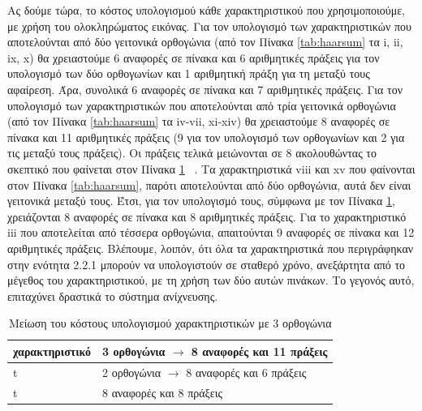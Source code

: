 Ας δούμε τώρα, το κόστος υπολογισμού κάθε χαρακτηριστικού που χρησιμοποιούμε, με
χρήση του ολοκληρώματος εικόνας. Για τον υπολογισμό των χαρακτηριστικών που αποτελούνται από
δύο γειτονικά ορθογώνια (από τον Πίνακα \ref{tab:haarsum} τα i, ii, ix, x) θα χρειαστούμε 6 αναφορές σε πίνακα
και 6 αριθμητικές πράξεις για τον υπολογισμό των δύο ορθογωνίων και 1 αριθμητική πράξη για τη
μεταξύ τους αφαίρεση. Άρα, συνολικά 6 αναφορές σε πίνακα και 7 αριθμητικές πράξεις. Για τον
υπολογισμό των χαρακτηριστικών που αποτελούνται από τρία γειτονικά ορθογώνια (από  τον Πίνακα
\ref{tab:haarsum} τα iv-vii, xi-xiv) θα χρειαστούμε 8 αναφορές σε πίνακα και 11 αριθμητικές πράξεις (9 για τον
υπολογισμό των ορθογωνίων και 2 για τις μεταξύ τους πράξεις). Οι πράξεις τελικά μειώνονται σε 8
ακολουθώντας το σκεπτικό που φαίνεται στον Πίνακα \ref{tab:opthaar} ~\cite{Lienhart02anextended}. Τα χαρακτηριστικά viii και xv
που φαίνονται στον Πίνακα \ref{tab:haarsum}, παρότι αποτελούνται από δύο ορθογώνια, αυτά δεν είναι γειτονικά
μεταξύ τους. Έτσι, για τον υπολογισμό τους, σύμφωνα με τον Πίνακα \ref{tab:opthaar}, χρειάζονται 8 αναφορές
σε πίνακα και 8 αριθμητικές πράξεις. Για το χαρακτηριστικό iii που αποτελείται από τέσσερα
ορθογώνια, απαιτούνται 9 αναφορές σε πίνακα και 12 αριθμητικές πράξεις. Βλέπουμε, λοιπόν, ότι
όλα τα χαρακτηριστικά που περιγράφηκαν στην ενότητα 2.2.1 μπορούν να υπολογιστούν σε σταθερό
χρόνο, ανεξάρτητα από το μέγεθος του χαρακτηριστικού, με τη χρήση των δύο αυτών πινάκων. Το
γεγονός αυτό, επιταχύνει δραστικά το σύστημα ανίχνευσης.


\begin{table}[htbp]
  \centering
    \begin{tabular}{ | l | l | }
    \hline
        χαρακτηριστικό  & 3 ορθογώνια $\rightarrow$ 8 αναφορές και 11 πράξεις \\
    \hline
        t  & 2 ορθογώνια $\rightarrow$ 8 αναφορές και 6 πράξεις \\
    \hline
       t &  8 αναφορές και 8 πράξεις \\
    \hline
  \end{tabular}
  \caption{Μείωση του κόστους υπολογισμού χαρακτηριστικών με 3 ορθογώνια}
  \label{tab:opthaar}
\end{table}


